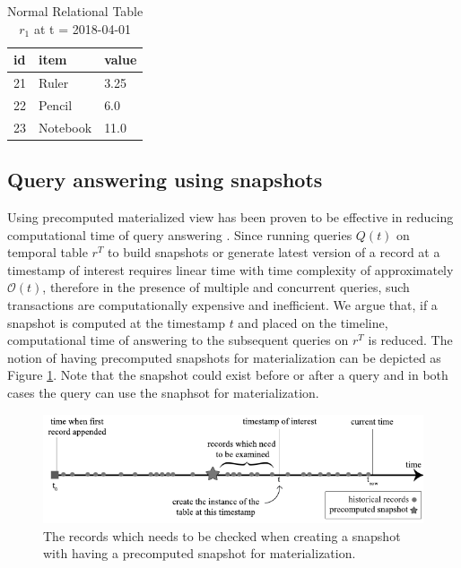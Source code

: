 \begin{center}
\begin{table}
	\centering
	\caption{Normal Relational Table $r_1$ at t = 2018-04-01}
	\label{table:normal_table_2_t}
	\begin{tabular}{p{4cm}p{4cm}p{4cm}}
		\hline
		id & item  & value  \\ \hline
		21 & Ruler & 3.25 \\
		22 & Pencil & 6.0   \\ 
		23 & Notebook & 11.0 \\ \hline
	\end{tabular}
\end{table}
\end{center}

\subsection{Query answering using snapshots} 

Using precomputed materialized view has been proven to be effective in reducing computational time of query answering \cite{sohrabi2016materialized} \cite{du2017deepsea}. Since running queries $Q(t)$ on temporal table $r^T$ to build snapshots or generate latest version of a record at a timestamp of interest requires linear time with time complexity of approximately $\mathcal{O}(t)$, therefore in the presence of multiple and concurrent queries, such transactions are computationally expensive and inefficient. We argue that, if a snapshot is computed at the timestamp $t$ and placed on the timeline, computational time of answering to the subsequent queries on $r^T$ is reduced. The notion of having precomputed snapshots for materialization can be depicted as Figure \ref{fig:snapshot_materialization}. Note that the snapshot could exist before or after a query and in both cases the query can use the snaphsot for materialization.

\begin{figure}[t]
	\label{fig:snapshot_materialization}
	\centering
	\includegraphics[width=\textwidth]{figs/snapshot_materialization.pdf}
	\caption{The records which needs to be checked when creating a snapshot with having a precomputed snapshot for materialization.}
\end{figure}

